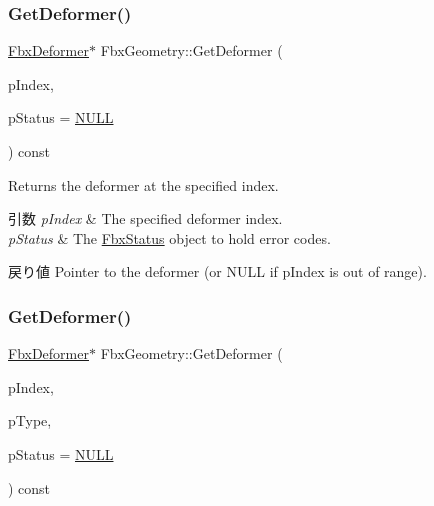 \subsubsection{\texorpdfstring{Get\+Deformer()}{GetDeformer()}\hspace{0.1cm}{\footnotesize\ttfamily [1/2]}}
{\footnotesize\ttfamily \hyperlink{class_fbx_deformer}{Fbx\+Deformer}$\ast$ Fbx\+Geometry\+::\+Get\+Deformer (\begin{DoxyParamCaption}\item[{int}]{p\+Index,  }\item[{\hyperlink{class_fbx_status}{Fbx\+Status} $\ast$}]{p\+Status = {\ttfamily \hyperlink{fbxarch_8h_a070d2ce7b6bb7e5c05602aa8c308d0c4}{N\+U\+LL}} }\end{DoxyParamCaption}) const}

Returns the deformer at the specified index. 
\begin{DoxyParams}{引数}
{\em p\+Index} & The specified deformer index. \\
\hline
{\em p\+Status} & The \hyperlink{class_fbx_status}{Fbx\+Status} object to hold error codes. \\
\hline
\end{DoxyParams}
\begin{DoxyReturn}{戻り値}
Pointer to the deformer (or {\ttfamily N\+U\+LL} if p\+Index is out of range). 
\end{DoxyReturn}
\mbox{\label{class_fbx_geometry_aa283c85cdc0c5c3d2eae56952b6a41a0}} 
\subsubsection{\texorpdfstring{Get\+Deformer()}{GetDeformer()}\hspace{0.1cm}{\footnotesize\ttfamily [2/2]}}
{\footnotesize\ttfamily \hyperlink{class_fbx_deformer}{Fbx\+Deformer}$\ast$ Fbx\+Geometry\+::\+Get\+Deformer (\begin{DoxyParamCaption}\item[{int}]{p\+Index,  }\item[{\hyperlink{class_fbx_deformer_a07e2cfb767191ba5c8799fdfbfe3eaf6}{Fbx\+Deformer\+::\+E\+Deformer\+Type}}]{p\+Type,  }\item[{\hyperlink{class_fbx_status}{Fbx\+Status} $\ast$}]{p\+Status = {\ttfamily \hyperlink{fbxarch_8h_a070d2ce7b6bb7e5c05602aa8c308d0c4}{N\+U\+LL}} }\end{DoxyParamCaption}) const}

